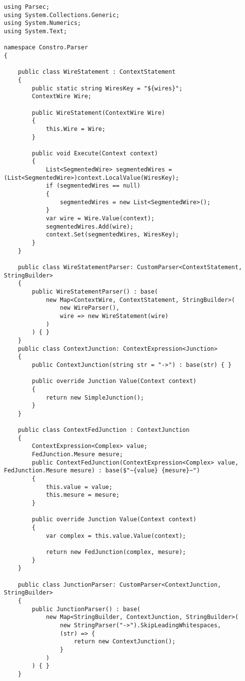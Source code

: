 \documentclass{scrartcl}
\begin{document}
\begin{lstlisting}[language={[Sharp]C}, caption={Wire}, label={experiment}]
using Parsec;
using System.Collections.Generic;
using System.Numerics;
using System.Text;

namespace Constro.Parser
{

    public class WireStatement : ContextStatement
    {
        public static string WiresKey = "${wires}";
        ContextWire Wire;

        public WireStatement(ContextWire Wire)
        {
            this.Wire = Wire;
        }

        public void Execute(Context context)
        {
            List<SegmentedWire> segmentedWires = (List<SegmentedWire>)context.LocalValue(WiresKey);
            if (segmentedWires == null)
            {
                segmentedWires = new List<SegmentedWire>();
            }
            var wire = Wire.Value(context);
            segmentedWires.Add(wire);
            context.Set(segmentedWires, WiresKey);
        }
    }

    public class WireStatementParser: CustomParser<ContextStatement, StringBuilder>
    {
        public WireStatementParser() : base(
            new Map<ContextWire, ContextStatement, StringBuilder>(
                new WireParser(),
                wire => new WireStatement(wire)
            )
        ) { }
    }
    public class ContextJunction: ContextExpression<Junction>
    {
        public ContextJunction(string str = "->") : base(str) { }

        public override Junction Value(Context context)
        {
            return new SimpleJunction();
        }
    }

    public class ContextFedJunction : ContextJunction
    {
        ContextExpression<Complex> value;
        FedJunction.Mesure mesure;
        public ContextFedJunction(ContextExpression<Complex> value, FedJunction.Mesure mesure) : base($"~{value} {mesure}~")
        {
            this.value = value;
            this.mesure = mesure;
        }

        public override Junction Value(Context context)
        {
            var complex = this.value.Value(context);

            return new FedJunction(complex, mesure);
        }
    }

    public class JunctionParser: CustomParser<ContextJunction, StringBuilder>
    {
        public JunctionParser() : base(
            new Map<StringBuilder, ContextJunction, StringBuilder>(
                new StringParser("->").SkipLeadingWhitespaces,
                (str) => {
                    return new ContextJunction();
                }
            )
        ) { }
    }


\end{lstlisting}
\end{document}
